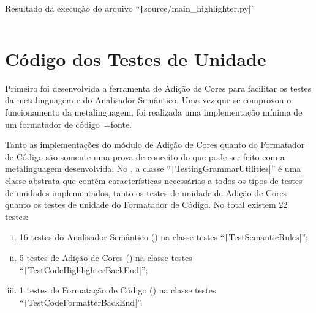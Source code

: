 \begin{code}
\caption[Resultado da execução do arquivo ``source/main\_highlighter.py'']{Resultado da execução do arquivo ``\texttt|source/main_highlighter.py|''}
\label{code:MainHighlighterPyResult}
\inputminted{text}{aftertext/main_highlighter_output.txt}
\end{code}


\chapter[Testes de Unidade]{Código dos Testes de Unidade}

Primeiro foi desenvolvida a ferramenta de Adição de Cores para facilitar os testes da metalinguagem e
do Analisador Semântico.
Uma vez que se comprovou o funcionamento da metalinguagem,
foi realizada uma implementação mínima de um formatador de código~=fonte.

Tanto as implementações do módulo de Adição de Cores quanto do Formatador de Código são somente uma prova de conceito do que pode ser feito com a metalinguagem desenvolvida.
No ,
a classe ``\texttt|TestingGrammarUtilities|'' é uma classe abstrata \cite{understandingDataAbstraction} que contém características necessárias a todos os tipos de testes de unidades implementados,
tanto os testes de unidade de Adição de Cores quanto os testes de unidade do Formatador de Código.
No total existem 22 testes:
\begin{enumerate}[i)]
\item 16 testes do Analisador Semântico () na classe testes ``\texttt|TestSemanticRules|'';
\item 5 testes de Adição de Cores () na classe testes ``\texttt|TestCodeHighlighterBackEnd|'';
\item 1 testes de Formatação de Código () na classe testes ``\texttt|TestCodeFormatterBackEnd|''.
\end{enumerate}%

